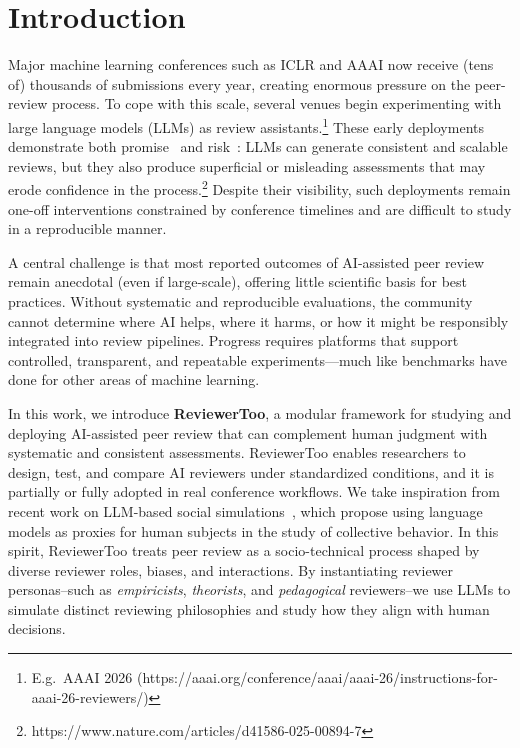 \documentclass{article} %
\begin{document}
\section{Introduction}
Major machine learning conferences such as ICLR and AAAI now receive (tens of) thousands of submissions every year, creating enormous pressure on the peer-review process. To cope with this scale, several venues begin experimenting with large language models (LLMs) as review assistants.\footnote{E.g.\ AAAI 2026 (https://aaai.org/conference/aaai/aaai-26/instructions-for-aaai-26-reviewers/)} These early deployments demonstrate both promise~\citep{liu2023reviewergpt,petrescu2022evolving,checco2021ai} and risk~\citep{liang2024can,latona2024ai}: LLMs can generate consistent and scalable reviews, but they also produce superficial or misleading assessments that may erode confidence in the process.\footnote{https://www.nature.com/articles/d41586-025-00894-7} Despite their visibility, such deployments remain one-off interventions constrained by conference timelines and are difficult to study in a reproducible manner.

A central challenge is that most reported outcomes of AI-assisted peer review remain anecdotal (even if large-scale), offering little scientific basis for best practices. Without systematic and reproducible evaluations, the community cannot determine where AI helps, where it harms, or how it might be responsibly integrated into review pipelines. Progress requires platforms that support controlled, transparent, and repeatable experiments---much like benchmarks have done for other areas of machine learning.

In this work, we introduce \textbf{ReviewerToo}, a modular framework for studying and deploying AI-assisted peer review that can complement human judgment with systematic and consistent assessments. ReviewerToo enables researchers to design, test, and compare AI reviewers under standardized conditions, and it is partially or fully adopted in real conference workflows. We take inspiration from recent work on LLM-based social simulations~\citep{anthis2025llm}, which propose using language models as proxies for human subjects in the study of collective behavior. In this spirit, ReviewerToo treats peer review as a socio-technical process shaped by diverse reviewer roles, biases, and interactions. By instantiating reviewer personas--such as \emph{empiricists}, \emph{theorists}, and \emph{pedagogical} reviewers--we use LLMs to simulate distinct reviewing philosophies and study how they align with human decisions.
\end{document}
